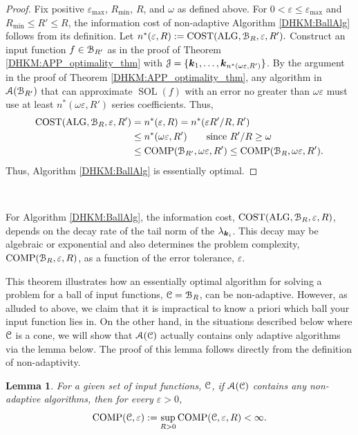 \documentclass[USenglish]{article}
\theoremstyle{dgthm}
\theoremstyle{dgthm}
\newtheorem{lemma}[theorem]{Lemma}
\theoremstyle{dgthm}
\theoremstyle{dgthm}
\theoremstyle{dgdef}
\theoremstyle{definition}
\DeclareMathOperator{\DHKMSOL}{SOL}
\DeclareMathOperator{\DHKMALG}{ALG}
\DeclareMathOperator{\DHKMCOST}{COST}
\DeclareMathOperator{\COMP}{COMP}
\begin{document}
\begin{proof}  Fix positive $\varepsilon_{\max}$, $R_{\min}$, $R$, and $\omega$ as defined above.  For $0 < \varepsilon \le \varepsilon_{\max}$ and $R_{\min} \le R' \le R$, the information cost of non-adaptive Algorithm  \ref{DHKM:BallAlg} follows from its definition.  Let 
$
n^*(\varepsilon,R) : = \DHKMCOST(\DHKMALG, \calB_R, \varepsilon,R').
$
Construct an input function $f \in {\mathcal{B}}_{R'}$ as in the proof of Theorem \ref{DHKM:APP_optimality_thm} with ${\mathcal{J}} = \{{\boldsymbol{k}}_1, \ldots, {\boldsymbol{k}}_{n^*(\omega \varepsilon,R')} \}$. By the argument in the proof of Theorem \ref{DHKM:APP_optimality_thm}, any algorithm in ${\mathcal{A}}({\mathcal{B}}_{R'})$ that can approximate $\DHKMSOL(f)$ with an error no greater than $\omega \varepsilon$ must use at least $n^*(\omega \varepsilon,R')$ series coefficients.  Thus, 
\begin{align*}
\DHKMCOST(\DHKMALG, \calB_R, \varepsilon,R') & =  n^*(\varepsilon,R) 
= n^*(\varepsilon R'/R,R') \\
& \le n^*(\omega \varepsilon, R') \qquad \text{since } R'/R \ge \omega
\\
& \le \COMP(\calB_{R'},\omega \varepsilon, R') \le  \COMP(\calB_{R},\omega \varepsilon, R').
\end{align*}
Thus, Algorithm \ref{DHKM:BallAlg} is essentially optimal.
\end{proof} \

For Algorithm \ref{DHKM:BallAlg}, the information cost, $\DHKMCOST(\DHKMALG,\calB_R,\varepsilon, R)$, depends on the decay rate of the tail norm of the $\lambda_{{\boldsymbol{k}}_i}$.  This decay may be algebraic or exponential and also determines the problem complexity, $\COMP(\calB_R,\varepsilon, R)$, as a function of the error tolerance, $\varepsilon$.  


This theorem illustrates how an essentially optimal algorithm for solving a problem for a ball of input functions, ${\mathcal{C}} = {\mathcal{B}}_R$, can be non-adaptive.  However, as alluded to above, we claim that it is impractical to know a priori which ball your input function lies in.  On the other hand, in the situations described below where ${\mathcal{C}}$ is a cone, we will show that ${\mathcal{A}}({\mathcal{C}})$ actually contains only adaptive algorithms via the lemma below.  The proof of this lemma follows directly from the definition of non-adaptivity.

\begin{lemma} \label{DHKM:NoNonAdpatLem}
For a given set of input functions, ${\mathcal{C}}$, if  ${\mathcal{A}}({\mathcal{C}})$ contains any non-adaptive algorithms, then for every $\varepsilon > 0$,
\begin{equation*}
    \COMP(\calC,\varepsilon) : = \sup_{R > 0} \COMP(\calC,\varepsilon, R) < \infty.
\end{equation*}
\end{lemma}
\end{document}
